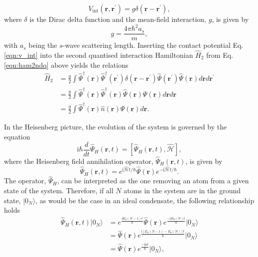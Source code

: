 \begin{equation}\label{eqn:v_int}
	V_{\text{int}}\left(\mathbf{r},\mathbf{r}^{\prime} \right) = g\delta\left(\mathbf{r} - \mathbf{r}^{\prime}\right),
\end{equation} where $\delta$ is the Dirac delta function and the mean-field interaction, $g$, is given by
\begin{equation}
	g = \frac{4\pi\hbar^2 a_s}{m},
\end{equation}
with $a_s$ being the $s$-wave scattering length. Inserting the contact potential Eq. \eqref{eqn:v_int} into the second quantised interaction Hamiltonian $\hat{H}_2$ from Eq. \eqref{eqn:ham2ndq} above yields the relations
\begin{subequations}
\begin{align}
\hat{H}_2 &= \frac{g}{2} \int \hat{\Psi}^{\dagger}(\mathbf{r})\hat{\Psi}^{\dagger}(\mathbf{r}^{\prime}) \delta\left(\textbf{r} - \textbf{r}^{\prime}\right)\hat{\Psi}(\mathbf{r}^{\prime})\hat{\Psi}(\textbf{r})d\textbf{r}d\textbf{r}^{\prime} \\
 & = \frac{g}{2}\int \hat{\Psi}^{\dagger}(\textbf{r})\hat{\Psi}^{\dagger}(\mathbf{r}) \hat{\Psi}(\mathbf{r})\hat{\Psi}(\mathbf{r})d\mathbf{r}d\mathbf{r} \\
 & = \frac{g}{2}\int \hat{\Psi}^{\dagger}\left(\mathbf{r}\right)\hat{n}\left(\mathbf{\mathbf{r}}\right)\hat{\Psi}(\mathbf{r})d\textbf{r}.
\end{align}
\end{subequations}

In the Heisenberg picture, the evolution of the system is governed by the equation
\begin{equation}\label{eqn:heisenberg}
\textrm{i}\hbar \frac{d}{d t}\hat{\Psi}_H\left(\mathbf{r}, t\right) = \left[\hat{\Psi}_{H}\left(\mathbf{r}, t\right), \hat{\mathcal{H}}  \right],
\end{equation}
where the Heisenberg field annihilation operator, $\hat{\Psi}_H\left(\textbf{r}, t\right)$, is given by
\begin{equation}\label{eqn:psi_heisenberg}
\hat{\Psi}_H\left(\mathbf{r}, {t} \right) = e^{{\textrm{i}\hat{\mathcal{H}}t / \hbar}}\hat{\Psi}\left(\mathbf{r}\right) e^{{-\textrm{i}\hat{\mathcal{H}}t / \hbar}}.
\end{equation}
The operator, $\hat{\Psi}_H$, can be interpreted as the one removing an atom from a given state of the system. Therefore, if all $N$ atoms in the system are in the ground state, $\vert 0_N\rangle$, as would be the case in an ideal condensate, the following relationship holds
\begin{subequations}
\begin{align}
\hat{\Psi}_{H}(\mathbf{r},t)\vert 0_N \rangle &= e^{\frac{\textrm{i}E_0(N-1)t}{\hbar}}\hat{\Psi}(\mathbf{r})e^{\frac{-\textrm{i}E_0(N)t}{\hbar}}\vert 0_N \rangle \\
&= \hat{\Psi}(\mathbf{r})e^{\frac{\textrm{i}[E_0(N-1) - E_0(N)]t}{\hbar}} \vert 0_N \rangle \\
&= \hat{\Psi}(\mathbf{r})e^{\frac{-\textrm{i}\mu t}{\hbar}} \vert 0_N \rangle,\label{eqn:psi_dagger_time} %
\end{align}
\end{subequations}

